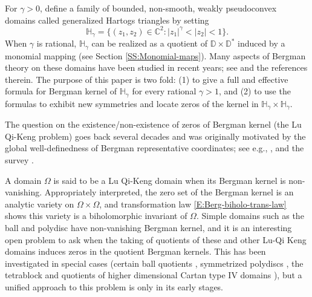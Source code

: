 \documentclass[letterpaper,11pt,reqno]{amsart}
\theoremstyle{plain}
\theoremstyle{definition}
\theoremstyle{remark}
\theoremstyle{remark}
\numberwithin{equation}{section}
\newcommand{\C}{{\mathbb C}}
\newcommand{\D}{{\mathbb D}}
\newcommand{\h}{{\mathbb H}}
\begin{document}
For $\gamma>0$, define a family of bounded, non-smooth, weakly pseudoconvex domains called generalized Hartogs triangles by setting
\begin{equation}\label{E:def=gen-Hartogs}
\h_\gamma = \{(z_1,z_2) \in \C^2 : |z_1|^\gamma < |z_2| < 1 \}.
\end{equation}
When $\gamma$ is rational, $\h_\gamma$ can be realized as 
a quotient of $\D \times \D^*$ induced by a monomial mapping (see Section \ref{SS:Monomial-maps}).
Many aspects of Bergman theory on these domains have been studied in recent years; see \cite{chakzeytuncu,Edh16,EdhMcN16,EdhMcN16b,EdhMcN20,ChEdMc19,KhLiTh19,CKMM20,bcem,HuoWick2020a, HuoWick2020b,ChrKoe23} and the references therein.
The purpose of this paper is two fold: 
(1) to give a full and effective formula for Bergman kernel of $\h_\gamma$ for every rational $\gamma > 1$, and (2) to use the formulas to exhibit new symmetries and locate zeros of the kernel in $\h_\gamma \times \h_\gamma$.

The question on the existence/non-existence of zeros of Bergman kernel (the Lu Qi-Keng problem) goes back several decades and was originally motivated by the global well-definedness of Bergman representative coordinates; see e.g., \cite{LQK-66}, and the survey \cite{Boas98}.

A domain $\Omega$ is said to be a Lu Qi-Keng domain when its Bergman kernel is non-vanishing.
Appropriately interpreted, the zero set of the Bergman kernel is an analytic variety on $\Omega \times \Omega$, and transformation law \eqref{E:Berg-biholo-trans-law} shows this variety is a biholomorphic invariant of $\Omega$.
Simple domains such as the ball and polydisc have non-vanishing Bergman kernel, and it is an interesting open problem to ask when the taking of quotients of these and other Lu-Qi Keng domains induces zeros in the quotient Bergman kernels.
This has been investigated in special cases (certain ball quotients \cite{BFS99}, symmetrized polydiscs \cite{EdiZwo05,NikZwo06}, the tetrablock \cite{Try13} and quotients of higher dimensional Cartan type IV domains \cite{GhoZwo25}), but a unified approach to this problem is only in its early stages.
\end{document}
